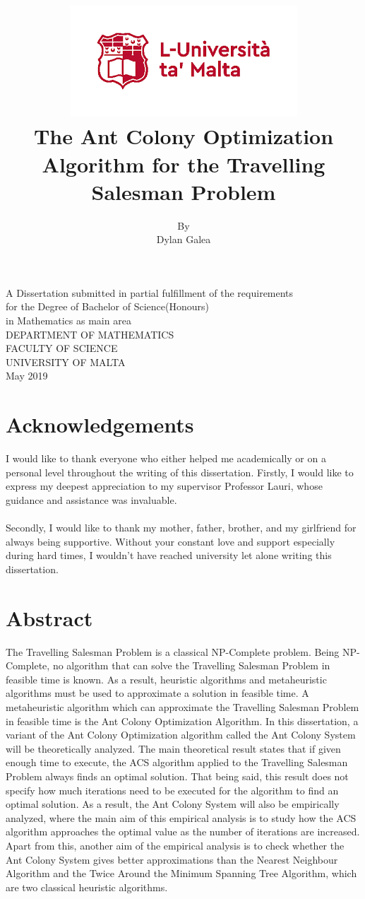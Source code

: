 \documentclass[12pt]{article}
\title{\includegraphics[scale=0.6]{screenshots/crest.png}\\[1cm]
The Ant Colony Optimization Algorithm for the Travelling Salesman Problem\vspace{-2ex}
}
\date{}
\author{By\\Dylan Galea\\[1cm]}
\numberwithin{equation}{subsection}
\numberwithin{table}{subsection}
\numberwithin{algorithm}{subsection}
\numberwithin{figure}{subsection}
\begin{document}
\clearpage\maketitle
\thispagestyle{empty}
{\centering A Dissertation submitted in partial fulfillment of the requirements\\
for the Degree of Bachelor of Science(Honours)\\ in Mathematics as main area\\[2cm]}
{\centering DEPARTMENT OF MATHEMATICS\\
FACULTY OF SCIENCE\\ UNIVERSITY OF MALTA\\[2cm]}
{\centering May 2019\\}
\newpage
{\center\section*{Acknowledgements}}
\noindent
I would like to thank everyone who either helped me academically or on a personal level throughout the writing of this dissertation. Firstly, I would like to express my deepest appreciation to my supervisor Professor Lauri, whose guidance and assistance was invaluable.\\\\
Secondly, I would like to thank my mother, father, brother, and my girlfriend for always being supportive. Without your constant love and support especially during hard times, I wouldn't have reached university let alone writing this dissertation.
\newpage
{\center\section*{Abstract}}
\noindent
The Travelling Salesman Problem is a classical NP-Complete problem. Being NP-Complete, no algorithm that can solve the Travelling Salesman Problem in feasible time is known. As a result, heuristic algorithms and metaheuristic algorithms must be used to approximate a solution in feasible time. A metaheuristic algorithm which can approximate the Travelling Salesman Problem in feasible time is the Ant Colony Optimization Algorithm. In this dissertation, a variant of the Ant Colony Optimization algorithm called the Ant Colony System will be theoretically analyzed. The main theoretical result states that if given enough time to execute, the ACS algorithm applied to the Travelling Salesman Problem always finds an optimal solution. That being said, this result does not specify how much iterations need to be executed for the algorithm to find an optimal solution. As a result, the Ant Colony System will also be empirically analyzed, where the main aim of this empirical analysis is to study how the ACS algorithm approaches the optimal value as the number of iterations are increased. Apart from this, another aim of the empirical analysis is to check whether the Ant Colony System gives better approximations than the Nearest Neighbour Algorithm and the Twice Around the Minimum Spanning Tree Algorithm, which are two classical heuristic algorithms.\\\\
\end{document}
